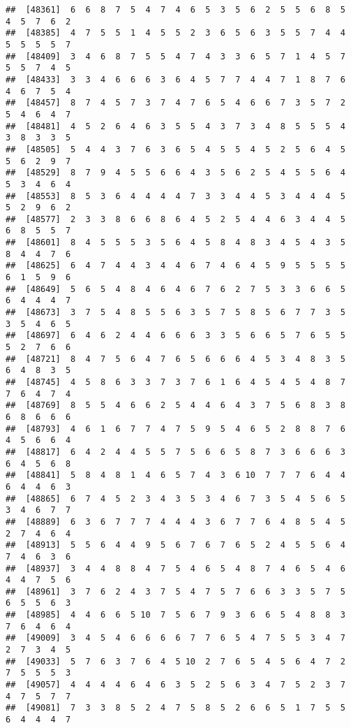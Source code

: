 \documentclass[
]{book}
\begin{document}
\begin{verbatim}
##  [48361]  6  6  8  7  5  4  7  4  6  5  3  5  6  2  5  5  6  8  5  4  5  7  6  2
##  [48385]  4  7  5  5  1  4  5  5  2  3  6  5  6  3  5  5  7  4  4  5  5  5  5  7
##  [48409]  3  4  6  8  7  5  5  4  7  4  3  3  6  5  7  1  4  5  7  5  5  7  4  5
##  [48433]  3  3  4  6  6  6  3  6  4  5  7  7  4  4  7  1  8  7  6  4  6  7  5  4
##  [48457]  8  7  4  5  7  3  7  4  7  6  5  4  6  6  7  3  5  7  2  5  4  6  4  7
##  [48481]  4  5  2  6  4  6  3  5  5  4  3  7  3  4  8  5  5  5  4  3  8  3  3  5
##  [48505]  5  4  4  3  7  6  3  6  5  4  5  5  4  5  2  5  6  4  5  5  6  2  9  7
##  [48529]  8  7  9  4  5  5  6  6  4  3  5  6  2  5  4  5  5  6  4  5  3  4  6  4
##  [48553]  8  5  3  6  4  4  4  4  7  3  3  4  4  5  3  4  4  4  5  5  2  9  6  2
##  [48577]  2  3  3  8  6  6  8  6  4  5  2  5  4  4  6  3  4  4  5  6  8  5  5  7
##  [48601]  8  4  5  5  5  3  5  6  4  5  8  4  8  3  4  5  4  3  5  8  4  4  7  6
##  [48625]  6  4  7  4  4  3  4  4  6  7  4  6  4  5  9  5  5  5  5  6  1  5  9  6
##  [48649]  5  6  5  4  8  4  6  4  6  7  6  2  7  5  3  3  6  6  5  6  4  4  4  7
##  [48673]  3  7  5  4  8  5  5  6  3  5  7  5  8  5  6  7  7  3  5  3  5  4  6  5
##  [48697]  6  4  6  2  4  4  6  6  6  3  3  5  6  6  5  7  6  5  5  5  2  7  6  6
##  [48721]  8  4  7  5  6  4  7  6  5  6  6  6  4  5  3  4  8  3  5  6  4  8  3  5
##  [48745]  4  5  8  6  3  3  7  3  7  6  1  6  4  5  4  5  4  8  7  7  6  4  7  4
##  [48769]  8  5  5  4  6  6  2  5  4  4  6  4  3  7  5  6  8  3  8  6  8  6  6  6
##  [48793]  4  6  1  6  7  7  4  7  5  9  5  4  6  5  2  8  8  7  6  4  5  6  6  4
##  [48817]  6  4  2  4  4  5  5  7  5  6  6  5  8  7  3  6  6  6  3  6  4  5  6  8
##  [48841]  5  8  4  8  1  4  6  5  7  4  3  6 10  7  7  7  6  4  4  6  4  4  6  3
##  [48865]  6  7  4  5  2  3  4  3  5  3  4  6  7  3  5  4  5  6  5  3  4  6  7  7
##  [48889]  6  3  6  7  7  7  4  4  4  3  6  7  7  6  4  8  5  4  5  2  7  4  6  4
##  [48913]  5  5  6  4  4  9  5  6  7  6  7  6  5  2  4  5  5  6  4  7  4  6  3  6
##  [48937]  3  4  4  8  8  4  7  5  4  6  5  4  8  7  4  6  5  4  6  4  4  7  5  6
##  [48961]  3  7  6  2  4  3  7  5  4  7  5  7  6  6  3  3  5  7  5  6  5  5  6  3
##  [48985]  4  4  6  6  5 10  7  5  6  7  9  3  6  6  5  4  8  8  3  7  6  4  6  4
##  [49009]  3  4  5  4  6  6  6  6  7  7  6  5  4  7  5  5  3  4  7  2  7  3  4  5
##  [49033]  5  7  6  3  7  6  4  5 10  2  7  6  5  4  5  6  4  7  2  7  5  5  5  3
##  [49057]  4  4  4  4  6  4  6  3  5  2  5  6  3  4  7  5  2  3  7  4  7  5  7  7
##  [49081]  7  3  3  8  5  2  4  7  5  8  5  2  6  6  5  1  7  5  5  6  4  4  4  7

\end{verbatim}
\end{document}
